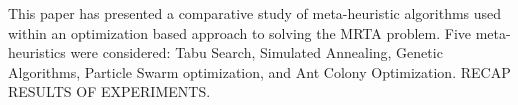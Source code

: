 \documentclass[a4paper]{article}
\begin{document}
This paper has presented a comparative study of meta-heuristic algorithms used within an optimization based approach to solving the MRTA problem. Five meta-heuristics were considered: Tabu Search, Simulated Annealing, Genetic Algorithms, Particle Swarm optimization, and Ant Colony Optimization. RECAP RESULTS OF EXPERIMENTS.

\printbibliography






\end{document}
